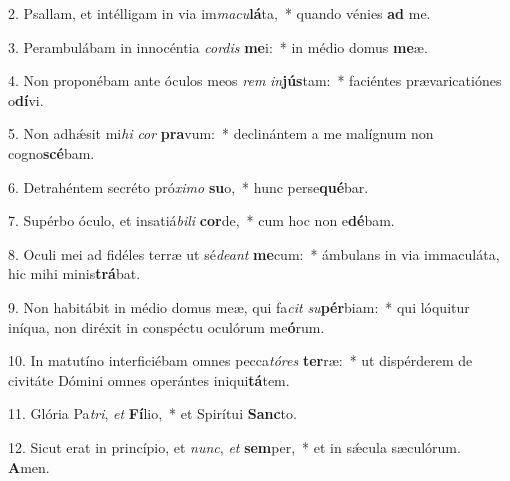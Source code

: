 2. Psallam, et intélligam in via im\textit{ma}\textit{cu}\textbf{lá}ta,~*  quando vénies \textbf{ad} me.\

3. Perambulábam in innocéntia \textit{cor}\textit{dis} \textbf{me}i:~*  in médio domus \textbf{me}æ.\

4. Non proponébam ante óculos meos \textit{rem} \textit{in}\textbf{jús}tam:~*  faciéntes prævaricatiónes o\textbf{dí}vi.\

5. Non adhǽsit mi\textit{hi} \textit{cor} \textbf{pra}vum:~*  declinántem a me malígnum non cogno\textbf{scé}bam.\

6. Detrahéntem secréto pró\textit{xi}\textit{mo} \textbf{su}o,~*  hunc perse\textbf{qué}bar.\

7. Supérbo óculo, et insatiá\textit{bi}\textit{li} \textbf{cor}de,~*  cum hoc non e\textbf{dé}bam.\

8. Oculi mei ad fidéles terræ ut sé\textit{de}\textit{ant} \textbf{me}cum:~*  ámbulans in via immaculáta, hic mihi minis\textbf{trá}bat.\

9. Non habitábit in médio domus meæ, qui fa\textit{cit} \textit{su}\textbf{pér}biam:~*  qui lóquitur iníqua, non diréxit in conspéctu oculórum me\textbf{ó}rum.\

10. In matutíno interficiébam omnes pecca\textit{tó}\textit{res} \textbf{ter}ræ:~*  ut dispérderem de civitáte Dómini omnes operántes iniqui\textbf{tá}tem.\

11. Glória Pa\textit{tri}, \textit{et} \textbf{Fí}lio,~*  et Spirítui \textbf{Sanc}to.\

12. Sicut erat in princípio, et \textit{nunc}, \textit{et} \textbf{sem}per,~*  et in sǽcula sæculórum. \textbf{A}men.\

